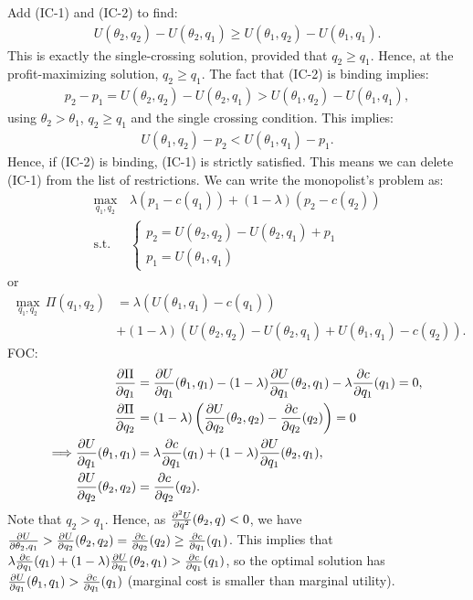 Add (IC-1) and (IC-2) to find:
\begin{align}
	U(\theta_2,q_2)-U(\theta_2,q_1)\geq U(\theta_1,q_2)-U(\theta_1,q_1).
\end{align}
This is exactly the single-crossing solution, provided that $q_2\geq q_1$. Hence, at the profit-maximizing solution, $q_2\geq q_1$. The fact that
(IC-2) is binding implies:
\begin{align}
	p_2-p_1=U(\theta_2,q_2)-U(\theta_2,q_1)>U(\theta_1,q_2)-U(\theta_1,q_1),
\end{align}
using $\theta_2>\theta_1$, $q_2\geq q_1$ and the single crossing condition. This implies:
\begin{align}
	U(\theta_1,q_2)-p_2<U(\theta_1,q_1)-p_1.
\end{align}
Hence, if (IC-2) is binding, (IC-1) is strictly satisfied. This means we can delete (IC-1) from the list of restrictions. We can write the
monopolist's problem as:
\begin{align}
	\underset{q_1,q_2}{\max}\, & \lambda(p_1-c(q_1))+(1-\lambda)(p_2-c(q_2)) \\
	\text{s.t. }               & \begin{cases}
		                             p_2=U(\theta_2,q_2)-U(\theta_2,q_1)+p_1 \\
		                             p_1=U(\theta_1,q_1)
	                             \end{cases}
\end{align}
or
\begin{align}
	\underset{q_1,q_2}{\max}\,\Pi(q_1,q_2) & =\lambda(U(\theta_1,q_1)-c(q_1))                                      \\
	                                       & +(1-\lambda)(U(\theta_2,q_2)-U(\theta_2,q_1)+U(\theta_1,q_1)-c(q_2)).
\end{align}
FOC:
\begin{align}
	\frac{\partial \Pi}{\partial q_1}                            & =\frac{\partial U}{\partial q_1}(\theta_1,q_1)-(1-\lambda)\frac{\partial U}{\partial q_1}(\theta_2,q_1)-\lambda\frac{\partial c}{\partial q_1}(q_1)=0, \\
	\frac{\partial \Pi}{\partial q_2}                            & =(1-\lambda)\left(\frac{\partial U}{\partial q_2}(\theta_2,q_2)-\frac{\partial c}{\partial q_2}(q_2)\right)=0                                \\
	\Longrightarrow\frac{\partial U}{\partial q_1}(\theta_1,q_1) & =\lambda\frac{\partial c}{\partial q_1}(q_1)+(1-\lambda)\frac{\partial U}{\partial q_1}(\theta_2,q_1),                               \\
	\frac{\partial U}{\partial q_2}(\theta_2,q_2)                & =\frac{\partial c}{\partial q_2}(q_2).
\end{align}
Note that $q_2>q_1$. Hence, as $\frac{\partial^2 U}{\partial q^2}(\theta_2,q)<0$, we have
$\frac{\partial U}{\partial \theta_2,q_1}>\frac{\partial U}{\partial q_2}(\theta_2,q_2)=\frac{\partial c}{\partial q_2}(q_2)\geq\frac{\partial c}{\partial q_1}(q_1)$. This implies that
$\lambda\frac{\partial c}{\partial q_1}(q_1)+(1-\lambda)\frac{\partial U}{\partial q_1}(\theta_2,q_1)>\frac{\partial c}{\partial q_1}(q_1)$, so the optimal solution has
$\frac{\partial U}{\partial q_1}(\theta_1,q_1)>\frac{\partial c}{\partial q_1}(q_1)$ (marginal cost is smaller than marginal utility).

